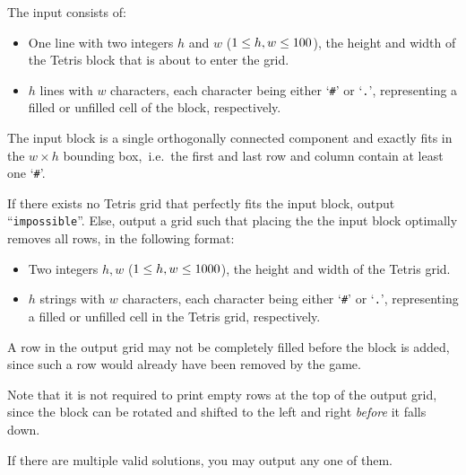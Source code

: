\begin{Input}
    The input consists of:
    \begin{itemize}
        \item One line with two integers $h$ and $w$ ($1\leq h,
    w\leq 100$), the height and width of the Tetris block that is about to
    enter the grid.
        \item $h$ lines with $w$ characters, each character being either `\texttt{\#}' or `\texttt{.}',
            representing a filled or unfilled cell of the block, respectively.
    \end{itemize}
    The input block is a single orthogonally\footnotemark{} connected component and exactly fits in the
    $w \times h$ bounding box,~i.e.~the first and last row and column contain at
    least one `\texttt{\#}'.
\end{Input}

\begin{Output}
    If there exists no Tetris grid that perfectly fits the input block, output ``\texttt{impossible}''.
    Else, output a grid such that placing the the input block optimally removes all rows, in the following format:

    \begin{itemize}
        \item Two integers $h, w$ ($1\leq h, w\leq 1000$), the height and width of the Tetris grid.
        \item $h$ strings with $w$ characters, each character being either `\texttt{\#}' or `\texttt{.}',
            representing a filled or unfilled cell in the Tetris grid, respectively.
    \end{itemize}

    A row in the output grid may not be completely filled before the block is added,
    since such a row would already have been removed by the game.

    Note that it is not required to print empty rows at the top of the output grid,
    since the block can be rotated and shifted to the left and right \emph{before} it falls down.

    If there are multiple valid solutions, you may output any one of them.
\end{Output}
